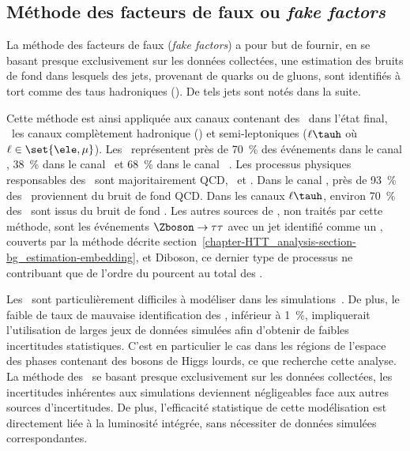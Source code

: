 \subsection{Méthode des facteurs de faux ou \emph{fake factors}}\label{chapter-HTT_analysis-section-bg_estimation-FF_method}
La méthode des facteurs de faux (\emph{fake factors}) a pour but de fournir, en se basant presque exclusivement sur les données collectées, une estimation des bruits de fond dans lesquels des jets, provenant de quarks ou de gluons, sont identifiés à tort comme des taus hadroniques (\tauh).
De tels jets sont notés \og \ftauh \fg{} dans la suite.
\par
Cette méthode est ainsi appliquée aux canaux contenant des \tauh\ dans l'état final, \ie\ les canaux complètement hadronique (\tauh\tauh) et semi-leptoniques ($\ell\tauh$ où $\ell\in\set{\ele,\mu}$).
Les \ftauhs\ représentent près de \SI{70}{\%} des événements dans le canal \tauh\tauh, \SI{38}{\%} dans le canal \mu\tauh\ et \SI{68}{\%} dans le canal \ele\tauh~\cite{CMS-NOTE-2018-257,CMS-NOTE-2019-170}.
Les processus physiques responsables des \ftauhs\ sont majoritairement QCD, \Wjets\ et \ttbar.
Dans le canal \tauh\tauh, près de \SI{93}{\%} des \ftauhs\ proviennent du bruit de fond QCD.
Dans les canaux $\ell\tauh$, environ \SI{70}{\%} des \ftauhs\ sont issus du bruit de fond \Wjets.
Les autres sources de \ftauhs, non traités par cette méthode, sont les événements $\Zboson\to\tau\tau$ avec un jet identifié comme un \tauh, couverts par la méthode décrite section~\ref{chapter-HTT_analysis-section-bg_estimation-embedding}, et Diboson, ce dernier type de processus ne contribuant que de l'ordre du pourcent au total des \ftauhs.
\par
Les \ftauhs\ sont particulièrement difficiles à modéliser dans les simulations~\cite{CMS-NOTE-2018-257,CMS-NOTE-2019-170}.
De plus, le faible de taux de mauvaise identification des \tauh, inférieur à \SI{1}{\%}, impliquerait l'utilisation de larges jeux de données simulées afin d'obtenir de faibles incertitudes statistiques.
C'est en particulier le cas dans les régions de l'espace des phases contenant des bosons de Higgs lourds, ce que recherche cette analyse.
La méthode des \fakefactors\ se basant presque exclusivement sur les données collectées, les incertitudes inhérentes aux simulations deviennent négligeables face aux autres sources d'incertitudes.
De plus, l'efficacité statistique de cette modélisation est directement liée à la luminosité intégrée, sans nécessiter de données simulées correspondantes.
